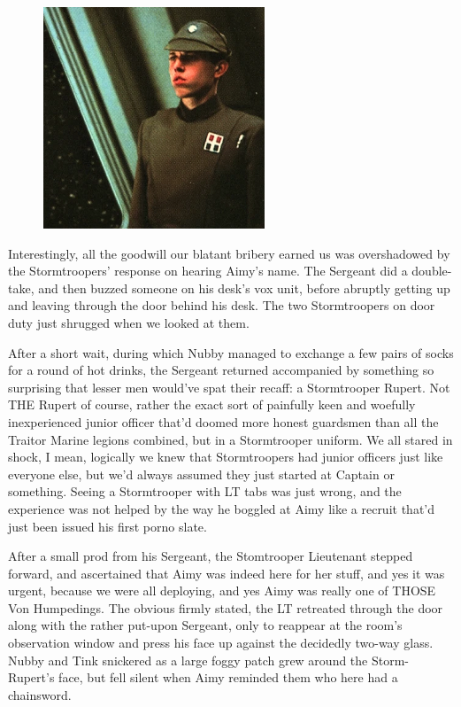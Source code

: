 \begin{figure}
	\begin{center}
		\includegraphics[width=\figwidth]{pics/21/69.png}
	\end{center}
\end{figure}
Interestingly, all the goodwill our blatant bribery earned us was overshadowed by the Stormtroopers' response on hearing Aimy's name. 
The Sergeant did a double-take, and then buzzed someone on his desk's vox unit, before abruptly getting up and leaving through the door behind his desk. 
The two Stormtroopers on door duty just shrugged when we looked at them.

After a short wait, during which Nubby managed to exchange a few pairs of socks for a round of hot drinks, the Sergeant returned accompanied by something so surprising that lesser men would've spat their recaff: 
a Stormtrooper Rupert. 
Not THE Rupert of course, rather the exact sort of painfully keen and woefully inexperienced junior officer that'd doomed more honest guardsmen than all the Traitor Marine legions combined, but in a Stormtrooper uniform. 
We all stared in shock, I mean, logically we knew that Stormtroopers had junior officers just like everyone else, but we'd always assumed they just started at Captain or something. 
Seeing a Stormtrooper with LT tabs was just wrong, and the experience was not helped by the way he boggled at Aimy like a recruit that'd just been issued his first porno slate.

After a small prod from his Sergeant, the Stomtrooper Lieutenant stepped forward, and ascertained that Aimy was indeed here for her stuff, and yes it was urgent, because we were all deploying, and yes Aimy was really one of THOSE Von Humpedings. 
The obvious firmly stated, the LT retreated through the door along with the rather put-upon Sergeant, only to reappear at the room's observation window and press his face up against the decidedly two-way glass. 
Nubby and Tink snickered as a large foggy patch grew around the Storm-Rupert's face, but fell silent when Aimy reminded them who here had a chainsword.

